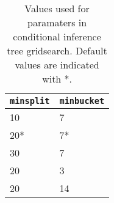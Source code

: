 \begin{table}[H]
    \centering
    \begin{tabular}{|p{3cm}|p{3cm}|}
        \hline
        \texttt{minsplit} & \texttt{minbucket} \\
        \hline
        \hline
        10 & 7 \\
        20* & 7* \\
        30 & 7 \\
        20 & 3 \\
        20 & 14 \\
        \hline
    \end{tabular}
    \caption{Values used for paramaters in conditional inference tree gridsearch. Default values are indicated with *.}
    \label{tab:ctree_params}
\end{table}
